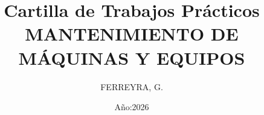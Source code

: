\newcommand{\nombre}{FERREYRA, Gustavo David }
\newcommand{\ano}{2026}
\newcommand{\curso}{$4^{to}1^{ra}$}
\newcommand{\materiaLong}{MANTENIMIENTO DE MÁQUINAS Y EQUIPOS}
\newcommand{\materia}{MANTENIMIENTO DE MAQ.y EQ.}
\newcommand{\logo}{images/4117}
\newcommand{\email}{gustavoferreyra@outlook.com}
\newcommand{\classroomcode}{pcm7eqa}
\newcommand{\urlqr}
{https://es.scribd.com/document/451441285}

\title{\Huge Cartilla de Trabajos Prácticos \\ 
\textbf{MANTENIMIENTO DE \\MÁQUINAS Y EQUIPOS}}
\date{Año:2026}
\author{FERREYRA, G.}
